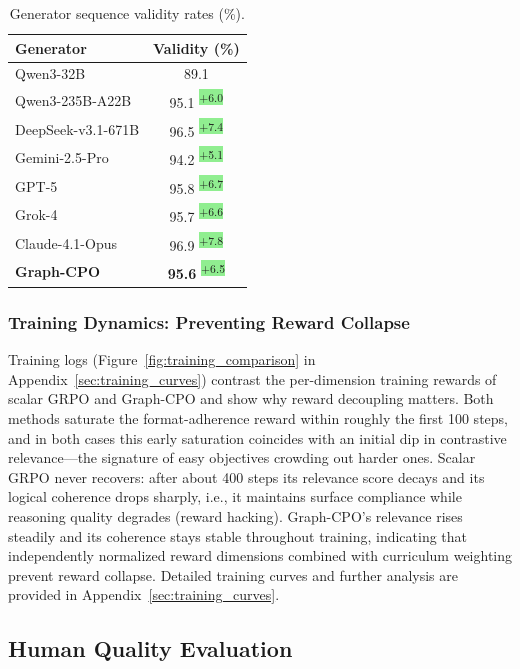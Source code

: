 \documentclass[sigconf, anonymous, review, screen]{acmart}
\newcommand{\ourmethod}{{Graph-CPO}}
\newcommand{\improve}[1]{\textsuperscript{\colorbox{lightgreen}{\textcolor{textgreen}{\tiny +#1}}}}
\begin{document}
\begin{table}[t]
\centering
\footnotesize
\caption{Generator sequence validity rates (\%).}
\label{tab:generator-validity}

\begin{tabular*}{\columnwidth}{@{\extracolsep{\fill}}lc}
\toprule
\textbf{Generator} & \textbf{Validity (\%)} \\
\midrule
Qwen3-32B & 89.1 \\
Qwen3-235B-A22B & 95.1 \improve{6.0} \\
DeepSeek-v3.1-671B & 96.5 \improve{7.4} \\
Gemini-2.5-Pro & 94.2 \improve{5.1} \\
GPT-5 & 95.8 \improve{6.7} \\
Grok-4 & 95.7 \improve{6.6} \\
Claude-4.1-Opus & 96.9 \improve{7.8} \\
\midrule
\textbf{\ourmethod{}} & \textbf{95.6} \improve{6.5} \\
\bottomrule
\end{tabular*}

\end{table}


\subsubsection{Training Dynamics: Preventing Reward Collapse}

Training logs (Figure~\ref{fig:training_comparison} in Appendix~\ref{sec:training_curves}) contrast the per-dimension training rewards of scalar GRPO and Graph-CPO and show why reward decoupling matters. Both methods saturate the format-adherence reward within roughly the first 100 steps, and in both cases this early saturation coincides with an initial dip in contrastive relevance---the signature of easy objectives crowding out harder ones. Scalar GRPO never recovers: after about 400 steps its relevance score decays and its logical coherence drops sharply, i.e., it maintains surface compliance while reasoning quality degrades (reward hacking). Graph-CPO's relevance rises steadily and its coherence stays stable throughout training, indicating that independently normalized reward dimensions combined with curriculum weighting prevent reward collapse. Detailed training curves and further analysis are provided in Appendix~\ref{sec:training_curves}.


\subsection{Human Quality Evaluation}
\end{document}
